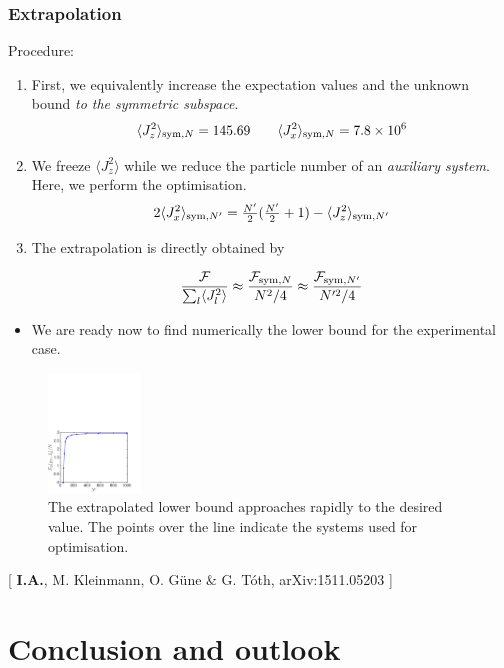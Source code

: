 \documentclass{beamer}
\newcommand{\expect}[1]{\ensuremath{\langle #1 \rangle}}
\newcommand{\citate}[1]{{\footnotesize{\color{gray}[ #1 ]}}

	}
\begin{document}
		\begin{frame}
			\frametitle{Extrapolation}
			Procedure:
			\begin{enumerate}
				\item<1-> First, we equivalently increase the expectation values and the unknown bound \emph{\color{blue}to the symmetric subspace}.
					\[
						\expect{J_z^2}_{{\rm sym},N} = 145.69 \qquad
						\expect{J_x^2}_{{\rm sym},N} = 7.8 \times 10^6
					\]
				\item<2-> We freeze $\expect{J_z^2}$ while we reduce the particle number of an \emph{\color{blue}auxiliary system}. Here, we perform the optimisation.
					\[ 2\expect{J_x^2}_{{\rm sym},N'} = \tfrac{N'}{2}(\tfrac{N'}{2}+1)- \expect{J_z^2}_{{\rm sym},N'} \]
				\item<3-> The extrapolation is directly obtained by
				\begin{block}
					{}
					\[ \frac{\mathcal{F}}{\sum_l \expect{J_l^2}}\approx  \frac{\mathcal{F}_{{\rm sym},N}}{N^2/4} \approx \frac{\mathcal{F}_{{\rm sym},N'}}{N'^2/4}
					\]
				\end{block}
			\end{enumerate}
		\end{frame}

		\begin{frame}
			\begin{itemize}
				\item We are ready now to find numerically the lower bound for the experimental case.
			\end{itemize}
			\begin{figure}
				\includegraphics[height=120px]{img/asymptoticapproach-dicke.pdf}
				\caption{The extrapolated lower bound approaches rapidly to the desired value. The points over the line indicate the systems used for optimisation.}
			\end{figure}
			\vspace{-15px}
			\citate{\textbf{I.A.}, M. Kleinmann, O. G\"une \& G. T\'oth, arXiv:1511.05203}
		\end{frame}

\section{Conclusion and outlook}
\end{document}
